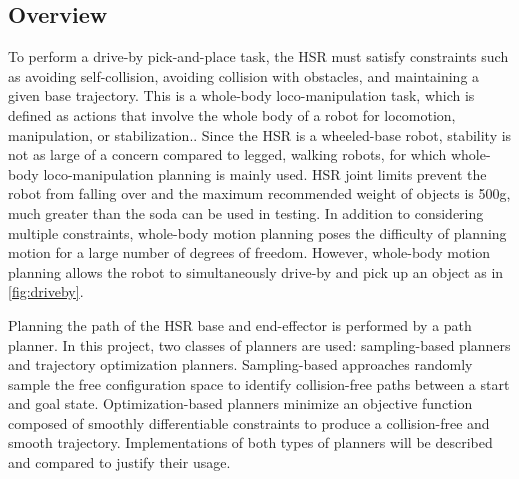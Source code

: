 \documentclass[11pt]{article}
\begin{document}
    \subsection{Overview}

        To perform a drive-by pick-and-place task, the HSR must satisfy constraints such as avoiding self-collision, avoiding collision with obstacles, and maintaining a given base trajectory. This is a whole-body loco-manipulation task, which is defined as actions that involve the whole body of a robot for locomotion, manipulation, or stabilization.\cite{kaiser_validation_2015}. Since the HSR is a wheeled-base robot, stability is not as large of a concern compared to legged, walking robots, for which whole-body loco-manipulation planning is mainly used. HSR joint limits prevent the robot from falling over and the maximum recommended weight of objects is 500g, much greater than the soda can be used in testing.\cite{noauthor_hsrb_manual_nodate} In addition to considering multiple constraints, whole-body motion planning poses the difficulty of planning motion for a large number of degrees of freedom. However, whole-body motion planning allows the robot to simultaneously drive-by and pick up an object as in \cref{fig:driveby}.
        \par Planning the path of the HSR base and end-effector is performed by a path planner. In this project, two classes of planners are used: sampling-based planners and trajectory optimization planners. Sampling-based approaches randomly sample the free configuration space to identify collision-free paths between a start and goal state. Optimization-based planners minimize an objective function composed of smoothly differentiable constraints to produce a collision-free and smooth trajectory. Implementations of both types of planners will be described and compared to justify their usage.
    
\end{document}
